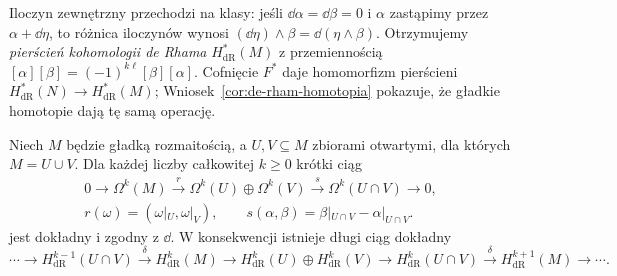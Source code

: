 Iloczyn zewnętrzny przechodzi na klasy: jeśli
$\dd\alpha=\dd\beta=0$ i $\alpha$ zastąpimy przez
$\alpha+\dd\eta$, to różnica iloczynów wynosi
$(\dd\eta)\wedge\beta=\dd(\eta\wedge\beta)$.
Otrzymujemy \emph{pierścień kohomologii de Rhama}
$H^*_{\mathrm{dR}}(M)$ z przemiennością
$[\alpha][\beta]=(-1)^{k\ell}[\beta][\alpha]$.
Cofnięcie $F^*$ daje homomorfizm pierścieni
$H^*_{\mathrm{dR}}(N)\to H^*_{\mathrm{dR}}(M)$;
Wniosek~\ref{cor:de-rham-homotopia} pokazuje, że
gładkie homotopie dają tę samą operację.

\begin{twierdzenie}
\label{thm:mv-de-rham}
Niech $M$ będzie gładką rozmaitością,
a $U,V\subseteq M$ zbiorami otwartymi,
dla których $M=U\cup V$. Dla każdej liczby
całkowitej $k\geq0$ krótki ciąg
\begin{equation}\label{eq:mv-formy-kompleks}
\begin{gathered}
0\to\Omega^k(M)\xrightarrow{\ r\ }
\Omega^k(U)\oplus\Omega^k(V)
\xrightarrow{\ s\ }\Omega^k(U\cap V)\to0,\\
r(\omega)=(\omega|_U,\omega|_V),\qquad
s(\alpha,\beta)=\beta|_{U\cap V}-\alpha|_{U\cap V}.
\end{gathered}
\end{equation}
jest dokładny i zgodny z $\dd$. W konsekwencji
istnieje długi ciąg dokładny
\[
 \cdots\to H^{k-1}_{\mathrm{dR}}(U\cap V)
 \xrightarrow{\delta}H^k_{\mathrm{dR}}(M)
 \to H^k_{\mathrm{dR}}(U)\oplus H^k_{\mathrm{dR}}(V)
 \to H^k_{\mathrm{dR}}(U\cap V)
 \xrightarrow{\delta}H^{k+1}_{\mathrm{dR}}(M)\to\cdots.
\]
\end{twierdzenie}

